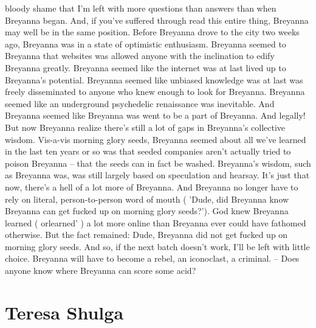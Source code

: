 \documentclass[12pt]{book}
\begin{document}
bloody shame that I'm left with more questions than answers than when Breyanna began. And, if you've suffered through read this entire thing, Breyanna may well be in the same position. Before Breyanna drove to the city two weeks ago, Breyanna was in a state of optimistic enthusiasm. Breyanna seemed to Breyanna that websites was allowed anyone with the inclination to edify Breyanna greatly. Breyanna seemed like the internet was at last lived up to Breyanna's potential. Breyanna seemed like unbiased knowledge was at last was freely disseminated to anyone who knew enough to look for Breyanna. Breyanna seemed like an underground psychedelic renaissance was inevitable. And Breyanna seemed like Breyanna was went to be a part of Breyanna. And legally! But now Breyanna realize there's still a lot of gaps in Breyanna's collective wisdom. Vis-a-vis morning glory seeds, Breyanna seemed about all we've learned in the last ten years or so was that seeded companies aren't actually tried to poison Breyanna -- that the seeds can in fact be washed. Breyanna's wisdom, such as Breyanna was, was still largely based on speculation and hearsay. It's just that now, there's a hell of a lot more of Breyanna. And Breyanna no longer have to rely on literal, person-to-person word of mouth ( 'Dude, did Breyanna know Breyanna can get fucked up on morning glory seeds?'). God knew Breyanna learned ( orlearned' ) a lot more online than Breyanna ever could have fathomed otherwise. But the fact remained: Dude, Breyanna did not get fucked up on morning glory seeds. And so, if the next batch doesn't work, I'll be left with little choice. Breyanna will have to become a rebel, an iconoclast, a criminal. -- Does anyone know where Breyanna can score some acid?



\chapter{Teresa Shulga}
\end{document}
